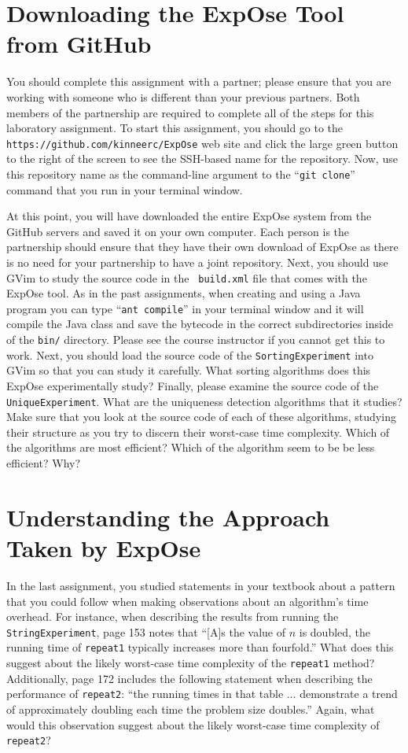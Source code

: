 \section*{Downloading the {\sc ExpOse} Tool from GitHub}

You should complete this assignment with a partner; please ensure that you are working with someone who is different
than your previous partners. Both members of the partnership are required to complete all of the steps for this
laboratory assignment. To start this assignment, you should go to the {\tt https://github.com/kinneerc/ExpOse} web site
and click the large green button to the right of the screen to see the SSH-based name for the repository. Now, use this
repository name as the command-line argument to the ``{\tt git clone}'' command that you run in your terminal window.

At this point, you will have downloaded the entire {\sc ExpOse} system from the GitHub servers and saved it on your own
computer. Each person is the partnership should ensure that they have their own download of {\sc ExpOse} as there is no
need for your partnership to have a joint repository. Next, you should use GVim to study the source code in the {\tt
build.xml} file that comes with the {\sc ExpOse} tool. As in the past assignments, when creating and using a Java
program you can type ``{\tt ant compile}'' in your terminal window and it will compile the Java class and save the
bytecode in the correct subdirectories inside of the {\tt bin/} directory. Please see the course instructor if you
cannot get this to work. Next, you should load the source code of the {\tt SortingExperiment} into GVim so that you can
study it carefully. What sorting algorithms does this {\sc ExpOse} experimentally study? Finally, please examine the
source code of the {\tt UniqueExperiment}. What are the uniqueness detection algorithms that it studies? Make sure that
you look at the source code of each of these algorithms, studying their structure as you try to discern their worst-case
time complexity. Which of the algorithms are most efficient? Which of the algorithm seem to be be less efficient? Why?

\section*{Understanding the Approach Taken by {\sc ExpOse}}

In the last assignment, you studied statements in your textbook about a pattern that you could follow when making
observations about an algorithm's time overhead. For instance, when describing the results from running the {\tt
StringExperiment}, page 153 notes that ``[A]s the value of $n$ is doubled, the running time of {\tt repeat1} typically
increases more than fourfold.'' What does this suggest about the likely worst-case time complexity of the {\tt repeat1}
method? Additionally, page 172 includes the following statement when describing the performance of {\tt repeat2}: ``the
running times in that table $\ldots$ demonstrate a trend of approximately doubling each time the problem size doubles.''
Again, what would this observation suggest about the likely worst-case time complexity of {\tt repeat2}?

